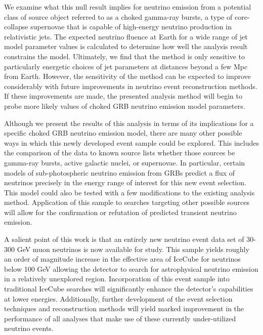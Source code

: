 \documentclass{gatech-thesis}
\begin{document}
\begin{preliminary}
\begin{preface}
We examine what this null result implies for neutrino emission from a potential class of source object referred to as a choked gamma-ray bursts, a type of core-collapse supernovae that is capable of high-energy neutrino production in relativistic jets. The expected neutrino fluence at Earth for a wide range of jet model parameter values is calculated to determine how well the analysis result constrains the model. Ultimately, we find that the method is only sensitive to particularly energetic choices of jet parameters at distances beyond a few Mpc from Earth. However, the sensitivity of the method can be expected to improve considerably with future improvements in neutrino event reconstruction methods. If these improvements are made, the presented analysis method will begin to probe more likely values of choked GRB neutrino emission model parameters.

Although we present the results of this analysis in terms of its implications for a specific choked GRB neutrino emission model, there are many other possible ways in which this newly developed event sample could be explored. This includes the comparison of the data to known source lists whether those sources be gamma-ray bursts, active galactic nuclei, or supernovae. In particular, certain models of sub-photospheric neutrino emission from GRBs predict a flux of neutrinos precisely in the energy range of interest for this new event selection. This model could also be tested with a few modifications to the existing analysis method. Application of this sample to searches targeting other possible sources will allow for the confirmation or refutation of predicted transient neutrino emission.

A salient point of this work is that an entirely new neutrino event data set of 30-300 GeV muon neutrinos is now available for study. This sample yields roughly an order of magnitude increase in the effective area of IceCube for neutrinos below 100 GeV allowing the detector to search for astrophysical neutrino emission in a relatively unexplored region. Incorporation of this event sample into traditional IceCube searches will significantly enhance the detector's capabilities at lower energies. Additionally, further development of the event selection techniques and reconstruction methods will yield marked improvement in the performance of all analyses that make use of these currently under-utilized neutrino events.

\end{preface}


\end{preliminary}
\end{document}
